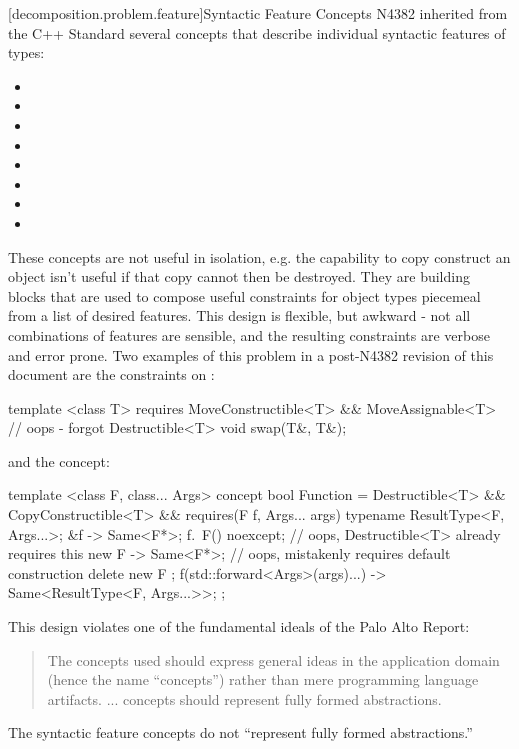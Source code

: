 [decomposition.problem.feature]{Syntactic Feature Concepts}
\pnum
N4382 inherited from the C++ Standard several concepts that describe individual syntactic
features of types:
\begin{itemize}
\item {}
\item {}
\item {}
\item {}
\item {}
\item {}
\item {}
\item {}
\end{itemize}
These concepts are not useful in isolation, e.g. the capability to copy construct an object
isn't useful if that copy cannot then be destroyed. They are building blocks that are used
to compose useful constraints for object types piecemeal from a list of desired features.
This design is flexible, but awkward - not all combinations of features are sensible, and
the resulting constraints are verbose and error prone. Two examples of this problem in
a post-N4382 revision of this document are the constraints on  :
\begin{codeblock}
template <class T>
  requires MoveConstructible<T> && MoveAssignable<T> // oops - forgot Destructible<T>
void swap(T&, T&);
\end{codeblock}
and the  concept:
\begin{codeblock}
template <class F, class... Args>
concept bool Function =
  Destructible<T> &&
  CopyConstructible<T> &&
  requires(F f, Args... args) {
    typename ResultType<F, Args...>;
    { &f } -> Same<F*>;
    { f.~F() } noexcept;   // oops, Destructible<T> already requires this
    { new F } -> Same<F*>; // oops, mistakenly requires default construction
    { delete new F };
    { f(std::forward<Args>(args)...) } -> Same<ResultType<F, Args...>>;
  };
\end{codeblock}

\pnum
This design violates one of the fundamental ideals of the Palo Alto Report:
\begin{quote}
The concepts used should express general ideas in the application domain (hence the name
``concepts'') rather than mere programming language artifacts. ... concepts should represent
fully formed abstractions.
\end{quote}
The syntactic feature concepts do not ``represent fully formed abstractions.''

